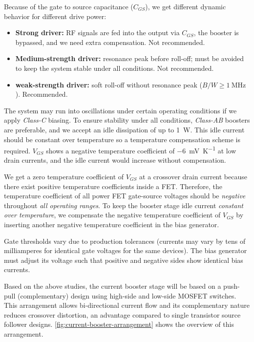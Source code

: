 Because of the gate to source capacitance ($C_{GS}$), we get different dynamic
behavior for different drive power:

\begin{itemize}[topsep=8pt,itemsep=4pt,partopsep=4pt, parsep=4pt]

    \item
    \textbf{Strong driver:} RF signals are fed into the output via $C_{GS}$,
    the booster is bypassed, and we need extra compensation.
    Not recommended.

    \item
    \textbf{Medium-strength driver:} resonance peak before roll-off;
    must be avoided to keep the system stable under all conditions.
    Not recommended.

    \item
    \textbf{weak-strength driver:} soft roll-off without resonance peak
    (\(B/W \ge \SI{1}{\mega\hertz}\)). Recommended.

\end{itemize}


The system may run into oscillations under certain operating conditions if we
apply \emph{Class-C} biasing.
To ensure stability under all conditions, \emph{Class-AB} boosters are
preferable, and we accept an idle dissipation of up to \SI{1}{\watt}.
This idle current should be constant over temperature so a temperature
compensation scheme is required.
$V_{GS}$ shows a negative temperature coefficient of
\SI{-6}{\milli\volt\per\kelvin} at low drain currents, and the idle current
would increase without compensation.

We get a zero temperature coefficient of $V_{GS}$  at a crossover drain
current because there exist positive temperature coefficients inside a
\ac{FET}.
Therefore, the temperature coefficient of all power \acs{FET} gate-source
voltages should be \textit{negative} throughout \textit{all operating ranges}.
To keep the booster stage idle current
\textit{constant over temperature}, we compensate the negative temperature
coefficient of $V_{GS}$ by inserting another negative temperature coefficient in
the bias generator.

Gate thresholds vary due to production tolerances (currents may vary by tens
of milliamperes for identical gate voltages for the same devices).
The bias generator must adjust its voltage such that positive and negative
sides show identical bias currents.

Based on the above studies, the current booster stage will be based on a
push-pull (complementary) design using high-side and low-side \acs{MOSFET}
switches.
This arrangement allows bi-directional current flow and its complementary nature
reduces crossover distortion, an advantage compared to single transistor
source follower designs.
\autoref{fig:current-booster-arrangement} shows the overview of this
arrangement.

